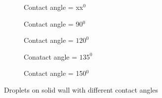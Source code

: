 \documentclass[a0,portrait]{a0poster}
\begin{document}
\begin{multicols}{3}
\begin{figure}[H]
	\begin{subfigure}{2cm}
		\caption{Contact angle = xx$ ^{0} $}
	\end{subfigure}
	\begin{subfigure}{2cm}            
		\caption{Contact angle = 90$ ^{0} $}
		\label{Fig:Datsa1}
	\end{subfigure}
	\begin{subfigure}{2cm}            
		\caption{Contact angle = $ 120^{0} $}
		\label{Fig:Datsase3}
	\end{subfigure}
	\begin{subfigure}{2cm}
		\caption{Conatact angle = $ 135^{0} $}
	\end{subfigure}
	\begin{subfigure}{2.5cm}
		\caption{Contact angle = 150$ ^{0} $}
	\end{subfigure}
	\caption{Droplets on solid wall with different contact angles }
	\label{fig:spinods}
\end{figure}


\end{multicols}
\end{document}
